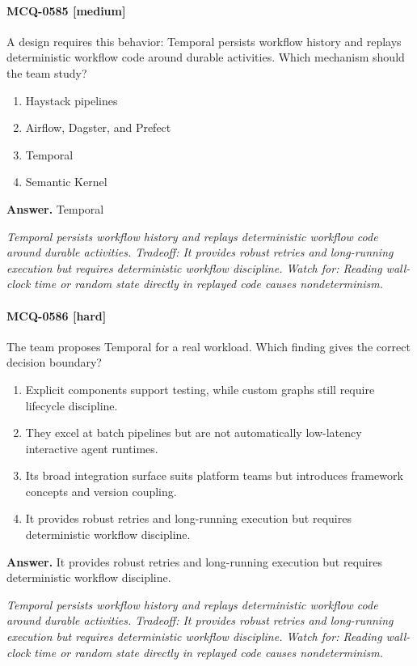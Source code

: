 \paragraph{MCQ-0585 [medium]} A design requires this behavior: Temporal persists workflow history and replays deterministic workflow code around durable activities. Which mechanism should the team study?
\begin{enumerate}[label=\Alph*.]
\item Haystack pipelines
\item Airflow, Dagster, and Prefect
\item Temporal
\item Semantic Kernel
\end{enumerate}
\noindent\textbf{Answer.} Temporal
\par\textit{Temporal persists workflow history and replays deterministic workflow code around durable activities. Tradeoff: It provides robust retries and long-running execution but requires deterministic workflow discipline. Watch for: Reading wall-clock time or random state directly in replayed code causes nondeterminism.}
\paragraph{MCQ-0586 [hard]} The team proposes Temporal for a real workload. Which finding gives the correct decision boundary?
\begin{enumerate}[label=\Alph*.]
\item Explicit components support testing, while custom graphs still require lifecycle discipline.
\item They excel at batch pipelines but are not automatically low-latency interactive agent runtimes.
\item Its broad integration surface suits platform teams but introduces framework concepts and version coupling.
\item It provides robust retries and long-running execution but requires deterministic workflow discipline.
\end{enumerate}
\noindent\textbf{Answer.} It provides robust retries and long-running execution but requires deterministic workflow discipline.
\par\textit{Temporal persists workflow history and replays deterministic workflow code around durable activities. Tradeoff: It provides robust retries and long-running execution but requires deterministic workflow discipline. Watch for: Reading wall-clock time or random state directly in replayed code causes nondeterminism.}
